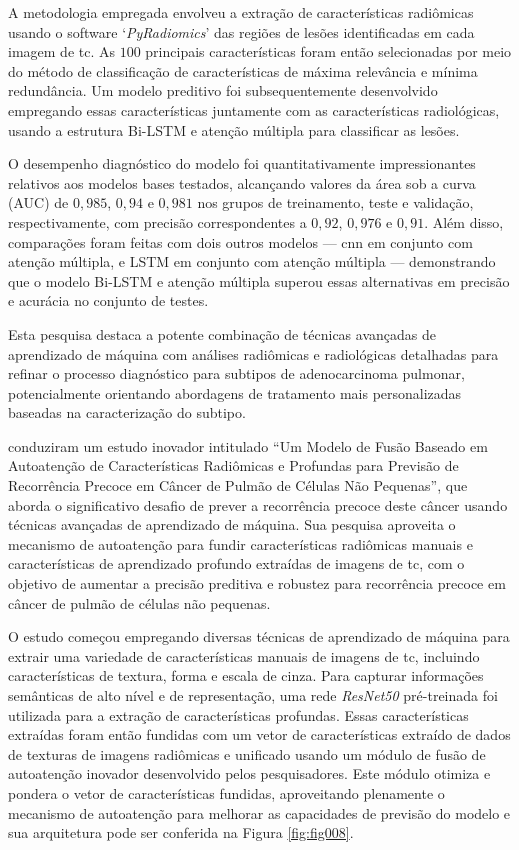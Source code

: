 A metodologia empregada envolveu a extração de características radiômicas usando o software `\textit{PyRadiomics}' das regiões de lesões identificadas em cada imagem de \gls{tc}. As $100$ principais características foram então selecionadas por meio do método de classificação de características de máxima relevância e mínima redundância. Um modelo preditivo foi subsequentemente desenvolvido empregando essas características juntamente com as características radiológicas, usando a estrutura Bi-LSTM e atenção múltipla para classificar as lesões.

O desempenho diagnóstico do modelo foi quantitativamente impressionantes relativos aos modelos bases testados, alcançando valores da área sob a curva (AUC) de $0,985$, $0,94$ e $0,981$ nos grupos de treinamento, teste e validação, respectivamente, com precisão correspondentes a $0,92$, $0,976$ e $0,91$. Além disso, comparações foram feitas com dois outros modelos — \gls{cnn} em conjunto com atenção múltipla, e LSTM em conjunto com atenção múltipla — demonstrando que o modelo Bi-LSTM e atenção múltipla superou essas alternativas em precisão e acurácia no conjunto de testes.

Esta pesquisa destaca a potente combinação de técnicas avançadas de aprendizado de máquina com análises radiômicas e radiológicas detalhadas para refinar o processo diagnóstico para subtipos de adenocarcinoma pulmonar, potencialmente orientando abordagens de tratamento mais personalizadas baseadas na caracterização do subtipo.

  conduziram um estudo inovador intitulado ``Um Modelo de Fusão Baseado em Autoatenção de Características Radiômicas e Profundas para Previsão de Recorrência Precoce em Câncer de Pulmão de Células Não Pequenas'', que aborda o significativo desafio de prever a recorrência precoce deste câncer usando técnicas avançadas de aprendizado de máquina. Sua pesquisa aproveita o mecanismo de autoatenção para fundir características radiômicas manuais e características de aprendizado profundo extraídas de imagens de \gls{tc}, com o objetivo de aumentar a precisão preditiva e robustez para recorrência precoce em câncer de pulmão de células não pequenas.

O estudo começou empregando diversas técnicas de aprendizado de máquina para extrair uma variedade de características manuais de imagens de \gls{tc}, incluindo características de textura, forma e escala de cinza. Para capturar informações semânticas de alto nível e de representação, uma rede \textit{ResNet50} pré-treinada foi utilizada para a extração de características profundas. Essas características extraídas foram então fundidas com um vetor de características extraído de dados de texturas de imagens radiômicas e unificado usando um módulo de fusão de autoatenção inovador desenvolvido pelos pesquisadores. Este módulo otimiza e pondera o vetor de características fundidas, aproveitando plenamente o mecanismo de autoatenção para melhorar as capacidades de previsão do modelo e sua arquitetura pode ser conferida na Figura \ref{fig:fig008}.

